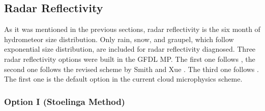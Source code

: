 \documentclass[letterpaper,titlepage,10pt]{article}
\numberwithin{equation}{section}
\begin{document}

\subsection{Radar Reflectivity}

As it was mentioned in the previous sections, radar reflectivity is the six month of hydrometeor size distribution. Only rain, snow, and graupel, which follow exponential size distribution, are included for radar reflectivity diagnosed. Three radar reflectivity options were built in the GFDL MP. The first one follows \citet{stoelinga2005simu}, the second one follows the revised \citet{stoelinga2005simu} scheme by Smith and Xue \citep{smith1975rada, tong2005ense}. The third one follows \citet{rogers1989asho}. The first one is the default option in the current cloud microphysics scheme.


\subsubsection*{Option I (Stoelinga Method)}
\end{document}
